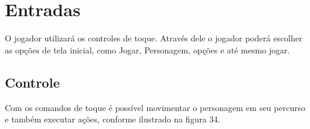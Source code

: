 \section {Entradas}
\label{ap:entradas}
O jogador utilizará os controles de toque. Através dele o jogador poderá escolher as opções de tela inicial, como Jogar, Personagem, opções e até mesmo jogar.

\subsection {Controle}
Com os comandos de toque é possível movimentar o personagem em seu percurso e também executar ações, conforme ilustrado na figura 34.

\begin{figure}[h!]
		\centering
	\end{figure}


